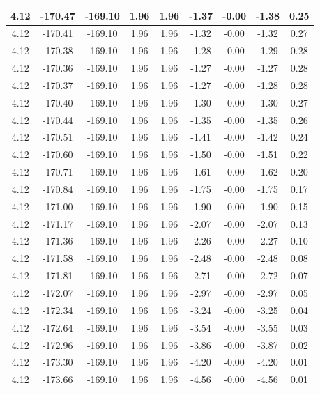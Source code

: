 \begin{table}[htbp]
\begin{adjustbox}{angle=90}
\begin{tabular}{|c|c|c|c|c|c|c|c|c|}
 4.12 & -170.47 & -169.10 & 1.96 & 1.96 & -1.37 & -0.00 & -1.38 & 0.25\\ \hline
 4.12 & -170.41 & -169.10 & 1.96 & 1.96 & -1.32 & -0.00 & -1.32 & 0.27\\ \hline
 4.12 & -170.38 & -169.10 & 1.96 & 1.96 & -1.28 & -0.00 & -1.29 & 0.28\\ \hline
 4.12 & -170.36 & -169.10 & 1.96 & 1.96 & -1.27 & -0.00 & -1.27 & 0.28\\ \hline
 4.12 & -170.37 & -169.10 & 1.96 & 1.96 & -1.27 & -0.00 & -1.28 & 0.28\\ \hline
 4.12 & -170.40 & -169.10 & 1.96 & 1.96 & -1.30 & -0.00 & -1.30 & 0.27\\ \hline
 4.12 & -170.44 & -169.10 & 1.96 & 1.96 & -1.35 & -0.00 & -1.35 & 0.26\\ \hline
 4.12 & -170.51 & -169.10 & 1.96 & 1.96 & -1.41 & -0.00 & -1.42 & 0.24\\ \hline
 4.12 & -170.60 & -169.10 & 1.96 & 1.96 & -1.50 & -0.00 & -1.51 & 0.22\\ \hline
 4.12 & -170.71 & -169.10 & 1.96 & 1.96 & -1.61 & -0.00 & -1.62 & 0.20\\ \hline
 4.12 & -170.84 & -169.10 & 1.96 & 1.96 & -1.75 & -0.00 & -1.75 & 0.17\\ \hline
 4.12 & -171.00 & -169.10 & 1.96 & 1.96 & -1.90 & -0.00 & -1.90 & 0.15\\ \hline
 4.12 & -171.17 & -169.10 & 1.96 & 1.96 & -2.07 & -0.00 & -2.07 & 0.13\\ \hline
 4.12 & -171.36 & -169.10 & 1.96 & 1.96 & -2.26 & -0.00 & -2.27 & 0.10\\ \hline
 4.12 & -171.58 & -169.10 & 1.96 & 1.96 & -2.48 & -0.00 & -2.48 & 0.08\\ \hline
 4.12 & -171.81 & -169.10 & 1.96 & 1.96 & -2.71 & -0.00 & -2.72 & 0.07\\ \hline
 4.12 & -172.07 & -169.10 & 1.96 & 1.96 & -2.97 & -0.00 & -2.97 & 0.05\\ \hline
 4.12 & -172.34 & -169.10 & 1.96 & 1.96 & -3.24 & -0.00 & -3.25 & 0.04\\ \hline
 4.12 & -172.64 & -169.10 & 1.96 & 1.96 & -3.54 & -0.00 & -3.55 & 0.03\\ \hline
 4.12 & -172.96 & -169.10 & 1.96 & 1.96 & -3.86 & -0.00 & -3.87 & 0.02\\ \hline
 4.12 & -173.30 & -169.10 & 1.96 & 1.96 & -4.20 & -0.00 & -4.20 & 0.01\\ \hline
 4.12 & -173.66 & -169.10 & 1.96 & 1.96 & -4.56 & -0.00 & -4.56 & 0.01\\ \hline

\end{tabular}
\end{adjustbox}
\end{table}
